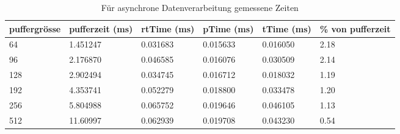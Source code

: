 \begin{table}[H]
\begin{center}
\begin{tabular}{ |p{1.4cm}||p{1.5cm}|p{1.7cm}|p{1.7cm}|p{1.6cm}|p{1.4cm}|  }
 \hline
 puffergrösse    & pufferzeit (ms)    & rtTime (ms)   & pTime (ms)    & tTime (ms) & \% von pufferzeit\\
 \hline
 64             & 1.451247      & 0.031683          & 0.015633          & 0.016050      & 2.18 \\
 96             & 2.176870      & 0.046585          & 0.016076          & 0.030509      & 2.14 \\
 128            & 2.902494      & 0.034745          & 0.016712          & 0.018032      & 1.19 \\
 192            & 4.353741      & 0.052279          & 0.018800          & 0.033478      & 1.20 \\
 256            & 5.804988      & 0.065752          & 0.019646          & 0.046105      & 1.13 \\
 512            & 11.60997      & 0.062939          & 0.019708          & 0.043230      & 0.54 \\
 \hline
\end{tabular}
\end{center}
\caption{Für asynchrone Datenverarbeitung gemessene Zeiten}
\label{tab:latency_async}
\end{table}

